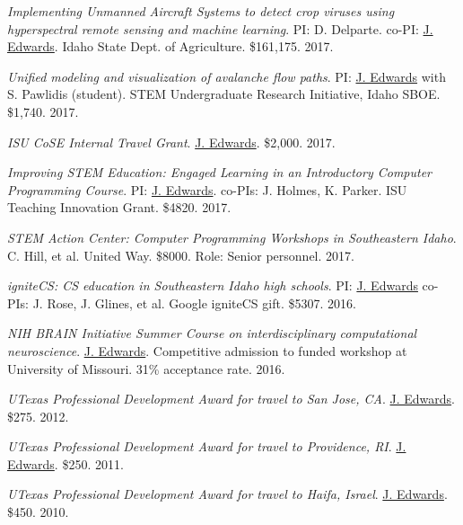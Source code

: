 \documentclass[margin,line]{res}
\begin{document}
\begin{resume}
\textit{Implementing Unmanned Aircraft Systems to detect crop viruses using hyperspectral remote sensing and machine learning}. PI: D. Delparte. co-PI: \underline{J. Edwards}. Idaho State Dept. of Agriculture. \$161,175. 2017.

\textit{Unified modeling and visualization of avalanche flow paths}. PI: \underline{J. Edwards} with S. Pawlidis (student). STEM Undergraduate Research Initiative, Idaho SBOE. \$1,740. 2017.

\textit{ISU CoSE Internal Travel Grant}. \underline{J. Edwards}. \$2,000. 2017.

\textit{Improving STEM Education: Engaged Learning in an Introductory  Computer Programming Course}. PI: \underline{J. Edwards}. co-PIs: J. Holmes, K. Parker. ISU Teaching Innovation Grant. \$4820. 2017.

\textit{STEM Action Center: Computer Programming Workshops in Southeastern Idaho}. C. Hill, et al. United Way. \$8000. Role: Senior personnel. 2017.

\textit{igniteCS: CS education in Southeastern Idaho high schools}. PI: \underline{J. Edwards} co-PIs: J. Rose, J. Glines, et al. Google igniteCS gift. \$5307. 2016.

\textit{NIH BRAIN Initiative Summer Course on interdisciplinary computational neuroscience}. \underline{J. Edwards}. Competitive admission to funded workshop at University of Missouri. 31\% acceptance rate. 2016. %

\textit{UTexas Professional Development Award for travel to San Jose, CA}. \underline{J. Edwards}. \$275. 2012. %

\textit{UTexas Professional Development Award for travel to Providence, RI}. \underline{J. Edwards}. \$250. 2011. %

\textit{UTexas Professional Development Award for travel to Haifa, Israel}. \underline{J. Edwards}. \$450. 2010. %



\end{resume}
\end{document}
